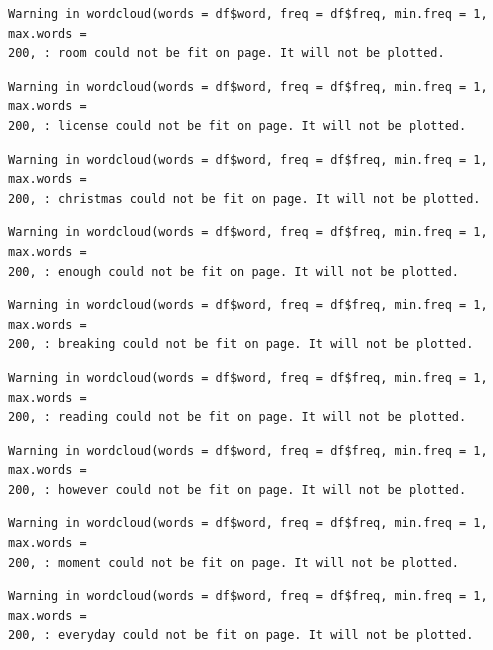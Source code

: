 \documentclass[
  .7em,
  letterpaper,
  DIV=11,
  numbers=noendperiod]{scrartcl}
\begin{document}
\begin{verbatim}
Warning in wordcloud(words = df$word, freq = df$freq, min.freq = 1, max.words =
200, : room could not be fit on page. It will not be plotted.
\end{verbatim}

\begin{verbatim}
Warning in wordcloud(words = df$word, freq = df$freq, min.freq = 1, max.words =
200, : license could not be fit on page. It will not be plotted.
\end{verbatim}

\begin{verbatim}
Warning in wordcloud(words = df$word, freq = df$freq, min.freq = 1, max.words =
200, : christmas could not be fit on page. It will not be plotted.
\end{verbatim}

\begin{verbatim}
Warning in wordcloud(words = df$word, freq = df$freq, min.freq = 1, max.words =
200, : enough could not be fit on page. It will not be plotted.
\end{verbatim}

\begin{verbatim}
Warning in wordcloud(words = df$word, freq = df$freq, min.freq = 1, max.words =
200, : breaking could not be fit on page. It will not be plotted.
\end{verbatim}

\begin{verbatim}
Warning in wordcloud(words = df$word, freq = df$freq, min.freq = 1, max.words =
200, : reading could not be fit on page. It will not be plotted.
\end{verbatim}

\begin{verbatim}
Warning in wordcloud(words = df$word, freq = df$freq, min.freq = 1, max.words =
200, : however could not be fit on page. It will not be plotted.
\end{verbatim}

\begin{verbatim}
Warning in wordcloud(words = df$word, freq = df$freq, min.freq = 1, max.words =
200, : moment could not be fit on page. It will not be plotted.
\end{verbatim}

\begin{verbatim}
Warning in wordcloud(words = df$word, freq = df$freq, min.freq = 1, max.words =
200, : everyday could not be fit on page. It will not be plotted.
\end{verbatim}
\end{document}
